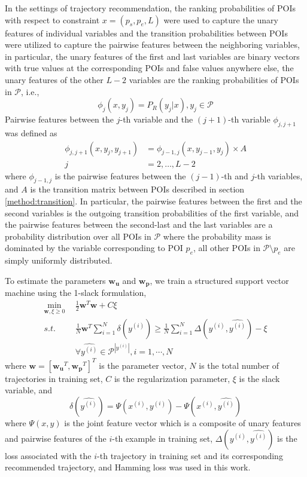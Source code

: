 In the settings of trajectory recommendation, the ranking probabilities of POIs 
with respect to constraint $x = (p_s, p_e, L)$ were used to capture the unary features of individual variables
and the transition probabilities between POIs were utilized to capture the pairwise features 
between the neighboring variables, in particular, 
the unary features of the first and last variables are binary vectors 
with true values at the corresponding POIs and false values anywhere else,
the unary features of the other $L-2$ variables are the ranking probabilities of POIs in $\mathcal{P}$, i.e.,
\begin{displaymath}
    \phi_j(x, y_j) = P_R(y_j | x), y_j \in \mathcal{P}
\end{displaymath}
Pairwise features between the $j$-th variable and the $(j+1)$-th variable $\phi_{j, j+1}$ was defined as
\begin{align*}
    \phi_{j, j+1}(x, y_j, y_{j+1}) &= \phi_{j-1, j}(x, y_{j-1}, y_j) \times A \\
                                 j &=2, \dots, L-2
\end{align*}
where $\phi_{j-1, j}$ is the pairwise features between the $(j-1)$-th and $j$-th variables, 
and $A$ is the transition matrix between POIs described in section \ref{method:transition}.
In particular, the pairwise features between the first and the second variables is the 
outgoing transition probabilities of the first variable,
and the pairwise features between the second-last and the last variables are a probability distribution 
over all POIs in $\mathcal{P}$ where the probability mass is dominated by the variable corresponding to POI $p_e$,
all other POIs in $\mathcal{P} \setminus p_e$ are simply uniformly distributed.


To estimate the parameters $\mathbf{w_u}$ and $\mathbf{w_p}$, we train a structured support vector machine 
using the 1-slack formulation\cite{ssvm09},
\begin{align*}
    \min_{\mathbf{w}, \xi \ge 0} ~~& \frac{1}{2} \mathbf{w}^T \mathbf{w} + C \xi \\
    s.t. ~~& \frac{1}{N} \mathbf{w}^T \sum_{i=1}^N \delta(\hat{y^{(i)}}) \ge 
                  \frac{1}{N} \sum_{i=1}^N \Delta(y^{(i)}, \hat{y^{(i)}}) - \xi \\
         ~~& \forall \hat{y^{(i)}} \in \mathcal{P}^{|y^{(i)}|}, i = 1, \cdots, N
\end{align*}
where $\mathbf{w} = [\mathbf{w_u}^T, \mathbf{w_p}^T]^T$ is the parameter vector, 
$N$ is the total number of trajectories in training set, $C$ is the regularization parameter,
$\xi$ is the slack variable, and
\begin{displaymath}
    \delta(\hat{y^{(i)}}) = \Psi(x^{(i)}, y^{(i)}) - \Psi(x^{(i)}, \hat{y^{(i)}})
\end{displaymath}
where $\Psi(x, y)$ is the joint feature vector which is a composite of unary features and pairwise features of the 
$i$-th example in training set, 
$\Delta(y^{(i)}, \hat{y^{(i)}})$ is the loss associated with the $i$-th trajectory in training set and 
its corresponding recommended trajectory, and Hamming loss was used in this work.

